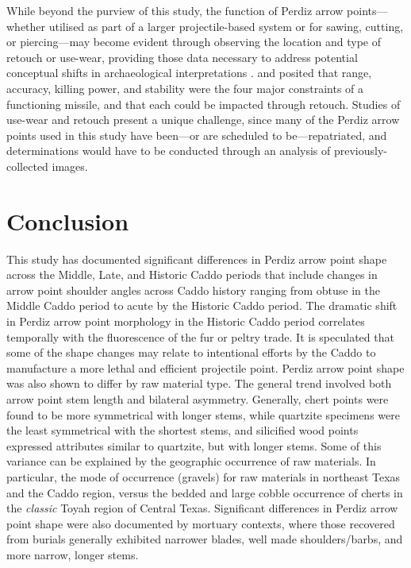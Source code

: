 \documentclass[review]{elsarticle}
\begin{document}
While beyond the purview of this study, the function of Perdiz arrow points---whether utilised as part of a larger projectile-based system or for sawing, cutting, or piercing---may become evident through observing the location and type of retouch or use-wear, providing those data necessary to address potential conceptual shifts in archaeological interpretations \citep{RN8990,RN8991,RN8992,RN6342}. \citet{RN8994} and \citet{RN8993} posited that range, accuracy, killing power, and stability were the four major constraints of a functioning missile, and that each could be impacted through retouch. Studies of use-wear and retouch present a unique challenge, since many of the Perdiz arrow points used in this study have been---or are scheduled to be---repatriated, and determinations would have to be conducted through an analysis of previously-collected images.

\section*{Conclusion}

This study has documented significant differences in Perdiz arrow point shape across the Middle, Late, and Historic Caddo periods that include changes in arrow point shoulder angles across Caddo history ranging from obtuse in the Middle Caddo period to acute by the Historic Caddo period. The dramatic shift in Perdiz arrow point morphology in the Historic Caddo period correlates temporally with the fluorescence of the fur or peltry trade. It is speculated that some of the shape changes may relate to intentional efforts by the Caddo to manufacture a more lethal and efficient projectile point. Perdiz arrow point shape was also shown to differ by raw material type. The general trend involved both arrow point stem length and bilateral asymmetry. Generally, chert points were found to be more symmetrical with longer stems, while quartzite specimens were the least symmetrical with the shortest stems, and silicified wood points expressed attributes similar to quartzite, but with longer stems. Some of this variance can be explained by the geographic occurrence of raw materials. In particular, the mode of occurrence (gravels) for raw materials in northeast Texas and the Caddo region, versus the bedded and large cobble occurrence of cherts in the \textit{classic} Toyah region of Central Texas. Significant differences in Perdiz arrow point shape were also documented by mortuary contexts, where those recovered from burials generally exhibited narrower blades, well made shoulders/barbs, and more narrow, longer stems.
\end{document}
